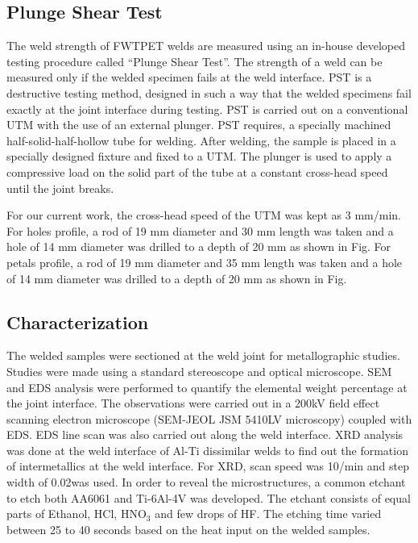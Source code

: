 \documentclass[3p]{elsarticle}
\begin{document}
\subsection{Plunge Shear Test}
\label{subsec:Plunge Shear Test}
The weld strength of FWTPET welds are measured using an in-house developed testing procedure called ``Plunge Shear Test''. The strength of a weld can be measured only if the welded specimen fails at the weld interface. PST is a destructive testing method, designed in such a way that the welded specimens fail exactly at the joint interface during testing. PST is carried out on a conventional UTM with the use of an external plunger. PST requires, a specially machined half-solid-half-hollow tube for welding. After welding, the sample is placed in a specially designed fixture and fixed to a UTM. The plunger is used to apply a compressive load on the solid part of the tube at a constant cross-head speed until the joint breaks.  
\par
For our current work, the cross-head speed of the UTM was kept as 3 mm/min. For holes profile, a rod of 19 mm diameter and 30 mm length was taken and a hole of 14 mm diameter was drilled to a depth of 20 mm as shown in Fig. For petals profile, a rod of 19 mm diameter and 35 mm length was taken and a hole of 14 mm diameter was drilled to a depth of 20 mm as shown in Fig. 

\subsection{Characterization}
\label{subsec:Characterization}
The welded samples were sectioned at the weld joint for metallographic studies. Studies were made using a standard stereoscope and optical microscope. SEM and EDS analysis were performed to quantify the elemental weight percentage at the joint interface. The observations were carried out in a 200kV field effect scanning electron microscope (SEM-JEOL JSM 5410LV microscopy) coupled with EDS. EDS line scan was also carried out along the weld interface. XRD analysis was done at the weld interface of Al-Ti dissimilar welds to find out the formation of intermetallics at the weld interface. For XRD, scan speed was 10\degree /min and step width of 0.02\degree was used. In order to reveal the microstructures, a common etchant to etch both AA6061 and Ti-6Al-4V was developed. The etchant consists of equal parts of Ethanol, HCl, HNO$_{3}$ and few drops of HF. The etching time varied between 25 to 40 seconds based on the heat input on the welded samples.
\end{document}
